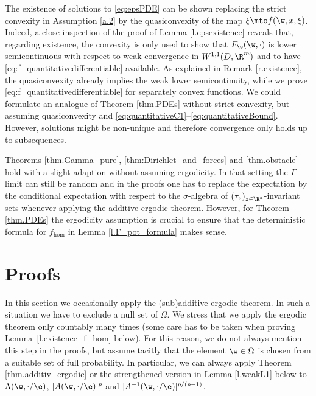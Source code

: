 \begin{remark}
\begin{enumeratea}
The existence of solutions to \eqref{eq:epsPDE} can be shown replacing the strict convexity in Assumption \ref{a.2} by the quasiconvexity of the map $\xi\mto f(\w,x,\xi)$. Indeed, a close inspection of the proof of Lemma \ref{l.epsexistence} reveals that, regarding existence, the convexity is only used to show that $F_{\e}(\w,\cdot)$ is lower semicontinuous with respect to weak convergence in $W^{1,1}(D,\R^m)$ and to have \eqref{eq:f_quantitativedifferentiable} available. As explained in Remark \ref{r.existence}, the quasiconvexity already implies the weak lower semicontinuity, while we prove \eqref{eq:f_quantitativedifferentiable} for separately convex functions. We could formulate an analogue of Theorem \ref{thm.PDEs} without strict convexity, but assuming quasiconvexity and \eqref{eq:quantitativeC1}--\eqref{eq:quantitativeBound}. However, solutions might be non-unique and therefore convergence only holds up to subsequences.

\item
Theorems \ref{thm.Gamma_pure}, \ref{thm:Dirichlet_and_forces} and \ref{thm.obstacle} hold with a slight adaption without assuming ergod\-icity. In that setting the $\Gamma$-limit can still be random and in the proofs one has to replace the expectation by the conditional expectation with respect to the $\sigma$-algebra of $(\tau_z)_{z\in\R^d}$-invariant sets whenever applying the additive ergodic theorem. However, for Theorem \ref{thm.PDEs} the ergodicity assumption is crucial to ensure that the deterministic formula for $f_{\hom}$ in Lemma \ref{l.F_pot_formula} makes sense.
\end{enumeratea}
\end{remark}
%
\section{Proofs}\label{s.proofs}
In this section we occasionally apply the (sub)additive ergodic theorem. In such a situation we have to exclude a null set of $\Omega$. We stress that we apply the ergodic theorem only countably many times (some care has to be taken when proving Lemma~\ref{l.existence_f_hom} below). For this reason, we do not always mention this step in the proofs, but assume tacitly that the element $\w\in\Omega$ is chosen from a suitable set of full probability. In particular, we can always apply Theorem \ref{thm.additiv_ergodic} or the strengthened version in Lemma \ref{l.weakL1} below to $\Lambda(\w,\cdot/\e)$, $|A(\w,\cdot/\e)|^p$ and $|A^{-1}(\w,\cdot/\e)|^{p/(p-1)}$.
